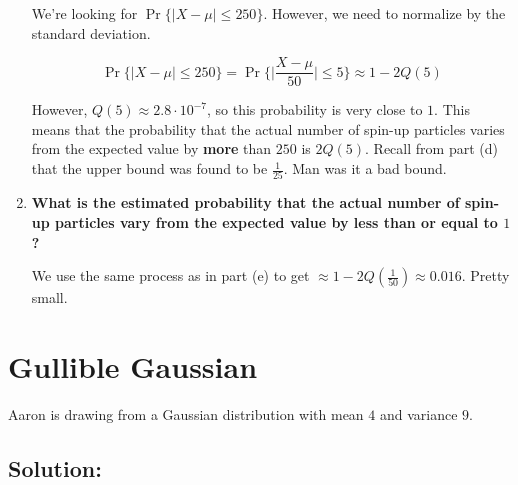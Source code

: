 \documentclass{article}
\begin{document}
\begin{enumerate}[label=(\alph*)]
    We're looking for $\Pr\{\vert X - \mu \vert \leq 250\}$. However, we need to normalize by the standard deviation.
    
    $$\Pr\{\vert X - \mu \vert \leq 250\} = \Pr\{\vert \frac{X - \mu}{50} \vert \leq 5\} \approx \boxed{1 - 2Q(5)}$$
    
    However, $Q(5) \approx 2.8 \cdot 10^{-7}$, so this probability is very close to $1$. This means that the probability that the actual number of spin-up particles varies from the expected value by \textbf{more} than $250$ is $2Q(5)$. Recall from part (d) that the upper bound was found to be $\frac{1}{25}$. Man was it a bad bound.

    \vspace{2cm}
    
    \item \textbf{What is the estimated probability that the actual number of spin-up particles vary from the expected value by less than or equal to $1$?}
    
    We use the same process as in part (e) to get $\approx \boxed{1 - 2Q(\frac{1}{50}) \approx 0.016}$. Pretty small.
    
\end{enumerate}

\newpage

\section{Gullible Gaussian}

Aaron is drawing from a Gaussian distribution with mean $4$ and variance $9$.

\subsection{Solution:}
\end{document}
